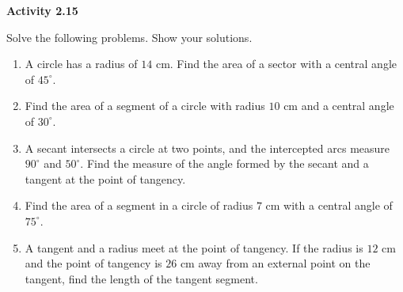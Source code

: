 \vspace{0.3ex}
\noindent\textbf{Activity 2.15}

\vspace{0.2ex}

Solve the following problems. Show your solutions.

\begin{enumerate}
    \item A circle has a radius of $14$ cm. Find the area of a sector with a central angle of $45^\circ$.
    \item Find the area of a segment of a circle with radius $10$ cm and a central angle of $30^\circ$.
    \item A secant intersects a circle at two points, and the intercepted arcs measure $90^\circ$ and $50^\circ$. Find the measure of the angle formed by the secant and a tangent at the point of tangency.
    \item Find the area of a segment in a circle of radius $7$ cm with a central angle of $75^\circ$.
    \item A tangent and a radius meet at the point of tangency. If the radius is $12$ cm and the point of tangency is $26$ cm away from an external point on the tangent, find the length of the tangent segment.
\end{enumerate}
